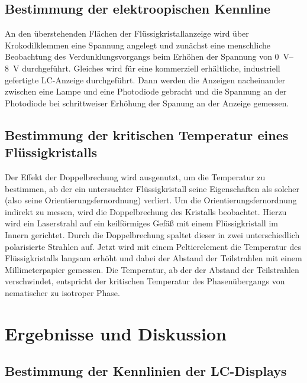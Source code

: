 \documentclass[
	a4paper,
	12pt,
	pagesize,
	ngerman
]{scrartcl}
\begin{document}
	\subsection{Bestimmung der elektroopischen Kennline}
	An den überstehenden Flächen der Flüssigkristallanzeige wird über Krokodilklemmen eine Spannung angelegt und zunächst eine menschliche Beobachtung des Verdunklungsvorgangs beim Erhöhen der Spannung von \SIrange{0}{8}{V} durchgeführt. %
	Gleiches wird für eine kommerziell erhältliche, industriell gefertigte LC-Anzeige durchgeführt.
	Dann werden die Anzeigen nacheinander zwischen eine Lampe und eine Photodiode gebracht und die Spannung an der Photodiode bei schrittweiser Erhöhung der Spanung an der Anzeige gemessen. %

	\subsection{Bestimmung der kritischen Temperatur eines Flüssigkristalls}
	Der Effekt der Doppelbrechung wird ausgenutzt, um die Temperatur zu bestimmen, ab der ein untersuchter Flüssigkristall seine Eigenschaften als solcher (also seine Orientierungsfernordnung) verliert.
	Um die Orientierungsfernordnung indirekt zu messen, wird die Doppelbrechung des Kristalls beobachtet.
	Hierzu wird ein Laserstrahl auf ein keilförmiges Gefäß mit einem Flüssigkristall im Innern gerichtet.
	Durch die Doppelbrechung spaltet dieser in zwei unterschiedlich polarisierte Strahlen auf.
	Jetzt wird mit einem Peltierelement die Temperatur des Flüssigkristalls langsam erhöht und dabei der Abstand der Teilstrahlen mit einem Millimeterpapier gemessen.
	Die Temperatur, ab der der Abstand der Teilstrahlen verschwindet, entspricht der kritischen Temperatur des Phasenübergangs von nematischer zu isotroper Phase.

	\section{Ergebnisse und Diskussion}
	\subsection{Bestimmung der Kennlinien der LC-Displays}
\end{document}
